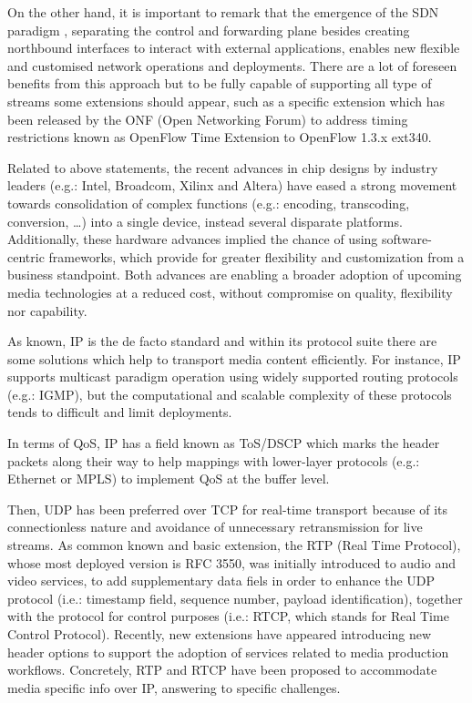 On the other hand, it is important to remark that the emergence of the SDN paradigm \cite{sdn}, separating the control and forwarding plane besides creating northbound interfaces to interact with external applications, enables new flexible and customised network operations and deployments. There are a lot of foreseen benefits from this approach but to be fully capable of supporting all type of streams some extensions should appear, such as a specific extension which has been released by the ONF (Open Networking Forum) to address timing restrictions known as OpenFlow \cite{sdn} Time Extension to OpenFlow 1.3.x ext340.

Related to above statements, the recent advances in chip designs by industry leaders (e.g.: Intel, Broadcom, Xilinx and Altera) have eased a strong movement towards consolidation of complex functions (e.g.: encoding, transcoding, conversion, \ldots ) into a single device, instead several disparate platforms. Additionally, these hardware advances implied the chance of using software-centric frameworks, which provide for greater flexibility and customization from a business standpoint. Both advances are enabling a broader adoption of upcoming media technologies at a reduced cost, without compromise on quality, flexibility nor capability. 

As known, IP is the de facto standard and within its protocol suite there are some solutions which help to transport media content efficiently. For instance, IP supports multicast \cite{mc} paradigm operation using widely supported routing protocols (e.g.: IGMP), but the computational and scalable complexity of these protocols tends to difficult and limit deployments.

In terms of QoS, IP has a field known as ToS/DSCP \cite{tosdscp} which marks the header packets along their way to help mappings with lower-layer protocols (e.g.: Ethernet or MPLS) to implement QoS at the buffer level.

Then, UDP has been preferred over TCP for real-time transport because of its connectionless nature and avoidance of unnecessary retransmission for live streams. As common known and basic extension, the RTP (Real Time Protocol), whose most deployed version is RFC 3550, was initially introduced to audio and video services, to add supplementary data fiels in order to enhance the UDP protocol (i.e.: timestamp field, sequence number, payload identification), together with the protocol for control purposes (i.e.: RTCP, which stands for Real Time Control Protocol). Recently, new extensions have appeared introducing new header options to support the adoption of services related to media production workflows. Concretely, RTP and RTCP have been proposed to accommodate media specific info over IP, answering to specific challenges.

